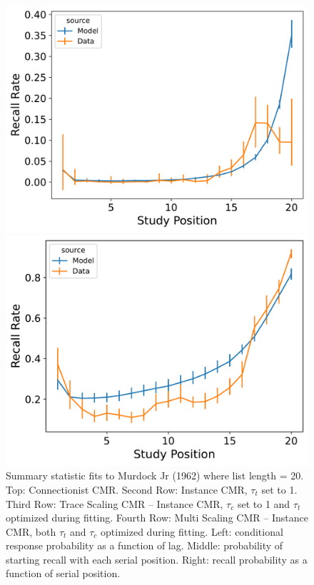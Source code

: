 \documentclass[
  letterpaper,
  11pt,
  english,
  singlespacing,
  headsepline]{MastersDoctoralThesis}
\begin{document}
\begin{figure}
\begin{minipage}{0.33\linewidth}
\includegraphics{icmr_figures/Murdock1962_MultiScalingCMR_Model_Fitting_LL20_pnr-1.png}\end{minipage}%
%
\begin{minipage}{0.33\linewidth}
\includegraphics{icmr_figures/Murdock1962_MultiScalingCMR_Model_Fitting_LL20_spc-1.png}\end{minipage}%

\caption{\label{fig-murdock1962memory20}Summary statistic fits to
Murdock Jr (1962) where list length = 20. Top: Connectionist CMR. Second
Row: Instance CMR, \(\tau_{t}\) set to 1. Third Row: Trace Scaling CMR
-- Instance CMR, \(\tau_{c}\) set to 1 and \(\tau_{t}\) optimized during
fitting. Fourth Row: Multi Scaling CMR -- Instance CMR, both
\(\tau_{t}\) and \(\tau_c\) optimized during fitting. Left: conditional
response probability as a function of lag. Middle: probability of
starting recall with each serial position. Right: recall probability as
a function of serial position.}

\end{figure}%
\end{document}

